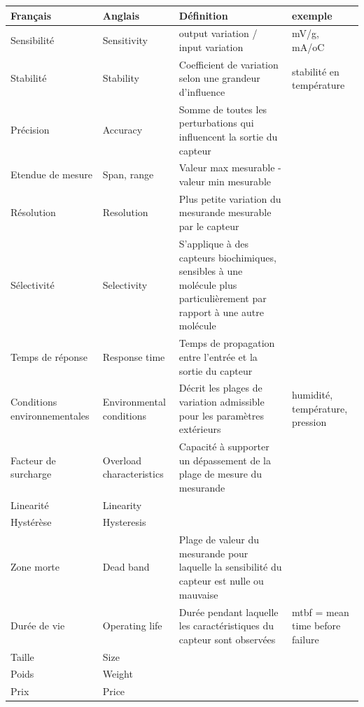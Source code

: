 \begin {center}
\begin{tabular}{|p{2.2cm}|p{2.8cm}|p{6.8cm}|p{2.4cm}|}
\hline
\textbf{Français} &	\textbf{Anglais} &	\textbf{Définition} &	\textbf{exemple} \\
\hline
\hline
Sensibilité &	Sensitivity &	output variation / input variation	 & mV/g, mA/oC \\
\hline
Stabilité &	Stability &	Coefficient de variation selon une grandeur d'influence &	stabilité en température \\
\hline
Précision &	Accuracy &	Somme de toutes les perturbations qui influencent la sortie du capteur	 &  \\
\hline
Etendue de mesure &	Span, range &	Valeur max mesurable - valeur min mesurable &	  \\
\hline
Résolution &	Resolution &	Plus petite variation du mesurande mesurable par le capteur &	  \\
\hline
Sélectivité &	Selectivity &	S'applique à des capteurs biochimiques, sensibles à une molécule plus particulièrement par rapport à une autre molécule &	  \\
\hline
Temps de réponse &	Response time &	Temps de propagation entre l'entrée et la sortie du capteur &	  \\
\hline
Conditions environnementales &	Environmental conditions &	Décrit les plages de variation admissible pour les paramètres extérieurs &	humidité, température, pression \\
\hline
Facteur de surcharge &	Overload characteristics &	Capacité à supporter un dépassement de la plage de mesure du mesurande & \\
\hline
Linearité &	Linearity & &	 	  \\
\hline
Hystérèse &	Hysteresis & &	 	  \\
\hline
Zone morte &	Dead band &	Plage de valeur du mesurande pour laquelle la sensibilité du capteur est nulle ou mauvaise &	 \\
\hline
Durée de vie &	Operating life &	Durée pendant laquelle les caractéristiques du capteur sont observées &	mtbf = mean time before failure \\
\hline
Taille & Size & &	 	  \\
\hline
Poids &	Weight & &	 	  \\
\hline
Prix &	Price & &	 	  \\
\hline
\end{tabular}
\end{center}

